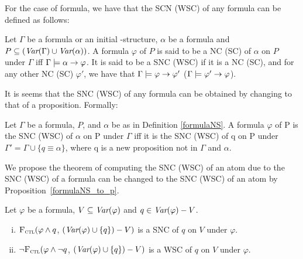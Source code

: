 \documentclass{article}
\begin{document}
For the case of formula, we have that the SCN (WSC) of any formula can be defined as follows:
\begin{definition}\label{formulaNS}
    Let $\Gamma$ be a formula or an initial \MPK-structure, $\alpha$ be a formula and $P\subseteq (\textit{Var}(\Gamma) \cup \textit{Var}(\alpha))$. A formula $\varphi$ of $P$ is  said to be a NC (SC) of $\alpha$ on $P$ under $\Gamma$ iff $\Gamma \models \alpha \rightarrow \varphi$. It is said to be a SNC (WSC) if it is a NC (SC), and for any other NC (SC) $\varphi'$, we have that $\Gamma \models \varphi \rightarrow \varphi'$ ($\Gamma \models \varphi' \rightarrow \varphi$).
    \end{definition}


  It is seems that the SNC (WSC) of any formula can be obtained by changing to that of a proposition. Formally:
\begin{proposition}\label{formulaNS_to_p}
     Let $\Gamma$ be a formula, $P$, and $\alpha$ be as in Definition \ref{formulaNS}. A formula $\varphi$ of P is the SNC (WSC) of $\alpha$ on P under  $\Gamma$ iff it is the SNC (WSC) of q on P under $\Gamma' = \Gamma \cup \{q \equiv \alpha\}$, where q is a new proposition not in $\Gamma$ and $\alpha$.
    \end{proposition}

We propose the theorem of computing the SNC (WSC) of an atom due to the SNC (WSC) of a formula can be changed to the SNC (WSC) of an atom by Proposition~\ref{formulaNS_to_p}.
\begin{theorem}\label{thm:SNC:WSC:forget}
 Let $\varphi$ be a formula, $V\subseteq\textit{Var}(\varphi)$ and $q\in\textit{Var}(\varphi)-V$.
 \begin{enumerate}[(i)]
   \item ${\textsc{F}_{\textsc{ctl}}} (\varphi \land q$, $(\textit{Var}(\varphi) \cup \{q\})-V)$
   is a SNC of $q$ on $V$ under $\varphi$.
   \item  $\neg{\textsc{F}_{\textsc{ctl}}} (\varphi \land \neg q$, $(\textit{Var}(\varphi) \cup \{q\})-V)$
   is a WSC of $q$ on $V$ under $\varphi$.
 \end{enumerate}
 \end{theorem}
\end{document}
